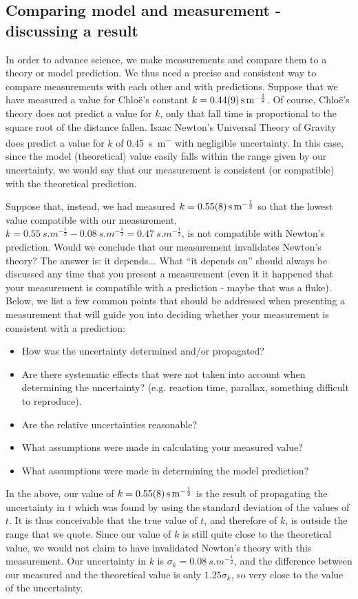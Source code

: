 \subsection{Comparing model and measurement - discussing a result}
In order to advance science, we make measurements and compare them to a theory or model prediction. We thus need a precise and consistent way to compare measurements with each other and with predictions. Suppose that we have measured a value for Chlo\"e's constant $k= \SI{0.44 \pm 0.09}{s.m^{-\frac{1}{2}}}$. Of course, Chlo\"e's theory does not predict a value for $k$, only that fall time is proportional to the square root of the distance fallen. Isaac Newton's Universal Theory of Gravity does predict a value for $k$ of \SI{0.45}{s.m^{-}} with negligible uncertainty. In this case, since the model (theoretical) value easily falls within the range given by our uncertainty, we would say that our measurement is consistent (or compatible) with the theoretical prediction. 

Suppose that, instead, we had measured $k=\SI{0.55 \pm 0.08}{s.m^{-\frac{1}{2}}}$ so that the lowest value compatible with our measurement, $k=\SI{0.55}{s.m^{-\frac{1}{2}}}-\SI{0.08}{s.m^{-\frac{1}{2}}}=\SI{0.47}{s.m^{-\frac{1}{2}}}$, is not compatible with Newton's prediction. Would we conclude that our measurement invalidates Newton's theory? The answer is: it depends... What ``it depends on'' should always be discussed any time that you present a measurement (even it it happened that your measurement is compatible with a prediction - maybe that was a fluke). Below, we list a few common points that should be addressed when presenting a measurement that will guide you into deciding whether your measurement is consistent with a prediction:
\begin{itemize}
\item How was the uncertainty determined and/or propagated?
\item Are there systematic effects that were not taken into account when determining the uncertainty? (e.g. reaction time, parallax, something difficult to reproduce).
\item Are the relative uncertainties reasonable?
\item What assumptions were made in calculating your measured value?
\item What assumptions were made in determining the model prediction? 
\end{itemize}
In the above, our value of $k= \SI{0.55 \pm 0.08}{s.m^{-\frac{1}{2}}}$ is the result of propagating the uncertainty in $t$ which was found by using the standard deviation of the values of $t$. It is thus conceivable that the true value of $t$, and therefore of $k$, is outside the range that we quote. Since our value of $k$ is still quite close to the theoretical value, we would not claim to have invalidated Newton's theory with this measurement. Our uncertainty in $k$ is $\sigma_k=\SI{0.08}{s.m^{-\frac{1}{2}}}$, and the difference between our measured and the theoretical value is only $1.25\sigma_k$, so very close to the value of the uncertainty. 

